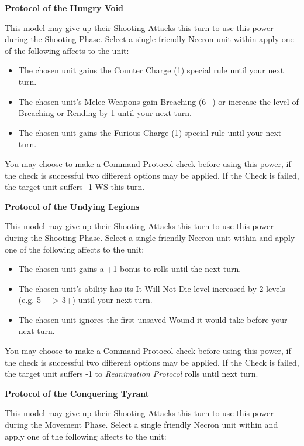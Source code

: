\begin{multicols}{2}
\textbf{Protocol of the Hungry Void}

This model may give up their Shooting Attacks this turn to use this power during the Shooting Phase. Select a single friendly Necron unit within  apply one of the following affects to the unit:

\begin{itemize}
	\itemsep 0pt
	\item The chosen unit gains the Counter Charge (1) special rule until your next turn.
	\item The chosen unit's Melee Weapons gain Breaching (6+) or increase the level of Breaching or Rending by 1 until your next turn.
	\item The chosen unit gains the Furious Charge (1) special rule until your next turn.
\end{itemize}

You may choose to make a Command Protocol check before using this power, if the check is successful two different options may be applied. If the Check is failed, the target unit suffers -1 WS this turn.

\textbf{Protocol of the Undying Legions}

This model may give up their Shooting Attacks this turn to use this power during the Shooting Phase. Select a single friendly Necron unit within  and apply one of the following affects to the unit:

\begin{itemize}
	\itemsep 0pt
	\item The chosen unit gains a +1 bonus to  rolls until the next turn.
	\item The chosen unit's  ability has its It Will Not Die level increased by 2 levels (e.g. 5+ -> 3+) until  your next turn.
	\item The chosen unit ignores the first unsaved Wound it would take before your next turn.
\end{itemize}

You may choose to make a Command Protocol check before using this power, if the check is successful two different options may be applied. If the Check is failed, the target unit suffers -1 to \textit{Reanimation Protocol} rolls until next turn.

\textbf{Protocol of the Conquering Tyrant}

This model may give up their Shooting Attacks this turn to use this power during the Movement Phase. Select a single friendly Necron unit within  and apply one of the following affects to the unit:


\end{multicols}
